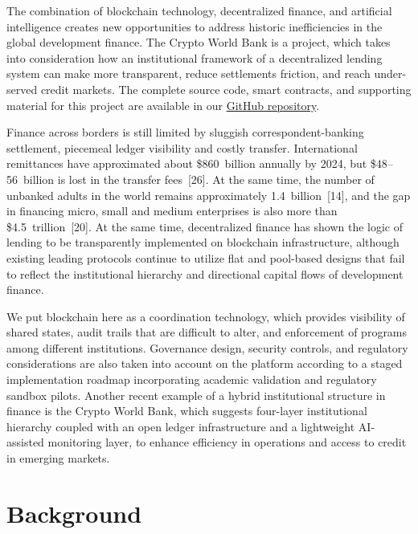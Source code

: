 \documentclass[12pt,a4paper]{report}
\begin{document}
The combination of blockchain technology, decentralized finance, and artificial intelligence creates new opportunities to address historic inefficiencies in the global development finance. The Crypto World Bank is a project, which takes into consideration how an institutional framework of a decentralized lending system can make more transparent, reduce settlements friction, and reach under-served credit markets. The complete source code, smart contracts, and supporting material for this project are available in our \href{https://github.com/Yuvraajrahman/Cryto-World-Bank}{GitHub repository}.

Finance across borders is still limited by sluggish correspondent-banking settlement, piecemeal ledger visibility and costly transfer. International remittances have approximated about \$860~billion annually by 2024, but \$48--56~billion is lost in the transfer fees~[26]. At the same time, the number of unbanked adults in the world remains approximately 1.4~billion~[14], and the gap in financing micro, small and medium enterprises is also more than \$4.5~trillion~[20]. At the same time, decentralized finance has shown the logic of lending to be transparently implemented on blockchain infrastructure, although existing leading protocols continue to utilize flat and pool-based designs that fail to reflect the institutional hierarchy and directional capital flows of development finance.

We put blockchain here as a coordination technology, which provides visibility of shared states, audit trails that are difficult to alter, and enforcement of programs among different institutions. Governance design, security controls, and regulatory considerations are also taken into account on the platform according to a staged implementation roadmap incorporating academic validation and regulatory sandbox pilots. Another recent example of a hybrid institutional structure in finance is the Crypto World Bank, which suggests four-layer institutional hierarchy coupled with an open ledger infrastructure and a lightweight AI-assisted monitoring layer, to enhance efficiency in operations and access to credit in emerging markets.

\section{Background}
\end{document}
